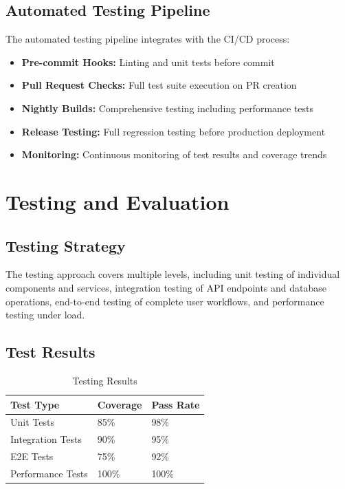 \documentclass[conference]{IEEEtran}
\begin{document}
\subsection{Automated Testing Pipeline}
The automated testing pipeline integrates with the CI/CD process:

\begin{itemize}
    \item \textbf{Pre-commit Hooks:} Linting and unit tests before commit
    \item \textbf{Pull Request Checks:} Full test suite execution on PR creation
    \item \textbf{Nightly Builds:} Comprehensive testing including performance tests
    \item \textbf{Release Testing:} Full regression testing before production deployment
    \item \textbf{Monitoring:} Continuous monitoring of test results and coverage trends
\end{itemize}

\section{Testing and Evaluation}
\subsection{Testing Strategy}
The testing approach covers multiple levels, including unit testing of individual components and services, integration testing of API endpoints and database operations, end-to-end testing of complete user workflows, and performance testing under load.

\subsection{Test Results}
\begin{table}[ht]
\centering
\caption{Testing Results}
\begin{tabular}{|l|l|l|}
\hline
\textbf{Test Type} & \textbf{Coverage} & \textbf{Pass Rate} \\
\hline
Unit Tests & 85\% & 98\% \\
\hline
Integration Tests & 90\% & 95\% \\
\hline
E2E Tests & 75\% & 92\% \\
\hline
Performance Tests & 100\% & 100\% \\
\hline
\end{tabular}
\end{table}
\end{document}
